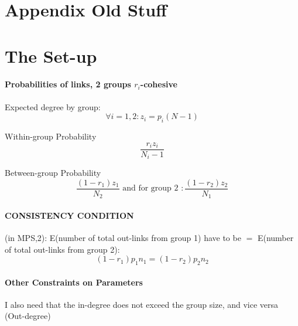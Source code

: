 \documentclass[12pt]{article}
\begin{document}
\newpage
\section{Appendix Old Stuff}

\section{The Set-up} 

\paragraph{Probabilities of links, 2 groups $r_i$-cohesive}

Expected degree by group:
\begin{equation*}
\forall i=1,2: z_i=p_i(N-1)
\end{equation*}

Within-group Probability
\begin{equation*}
\frac{r_i z_i }{N_i -1}
\end{equation*}

Between-group Probability
\begin{equation*}
\frac{(1-r_1) z_1 }{N_2} \text{ and for group 2 }: \frac{(1-r_2) z_2 }{N_1}
\end{equation*}

\paragraph{CONSISTENCY CONDITION}
(in MPS,2): E(number of total out-links from group 1) have to be $=$  E(number of total out-links from group 2):
\begin{equation*}
(1-r_1) p_1 n_1 = (1-r_2) p_2 n_2
\end{equation*}



\paragraph{Other Constraints on Parameters}

I also need that the in-degree does not exceed the group size, and vice versa (Out-degree)
\end{document}
